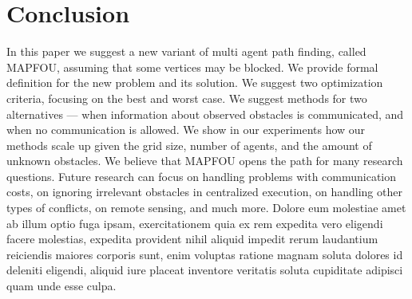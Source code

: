 \documentclass[letterpaper]{article} %
\begin{document}
\section{Conclusion}
In this paper we suggest a new variant of multi agent path finding, called MAPFOU, assuming that some vertices may be blocked. We provide formal definition for the new problem and its solution. We suggest two optimization criteria, focusing on the best and worst case. We suggest methods for two alternatives --- when information about observed obstacles is communicated, and when no communication is allowed. We show in our experiments how our methods scale up given the grid size, number of agents, and the amount of unknown obstacles.
We believe that MAPFOU opens the path for many research questions. Future research can focus on handling problems with communication costs, on ignoring irrelevant obstacles in centralized execution, on handling other types of conflicts, on remote sensing, and much more.
Dolore eum molestiae amet ab illum optio fuga ipsam, exercitationem quia ex rem expedita vero eligendi facere molestias, expedita provident nihil aliquid impedit rerum laudantium reiciendis maiores corporis sunt, enim voluptas ratione magnam soluta dolores id deleniti eligendi, aliquid iure placeat inventore veritatis soluta cupiditate adipisci quam unde esse culpa.\clearpage

\end{document}
